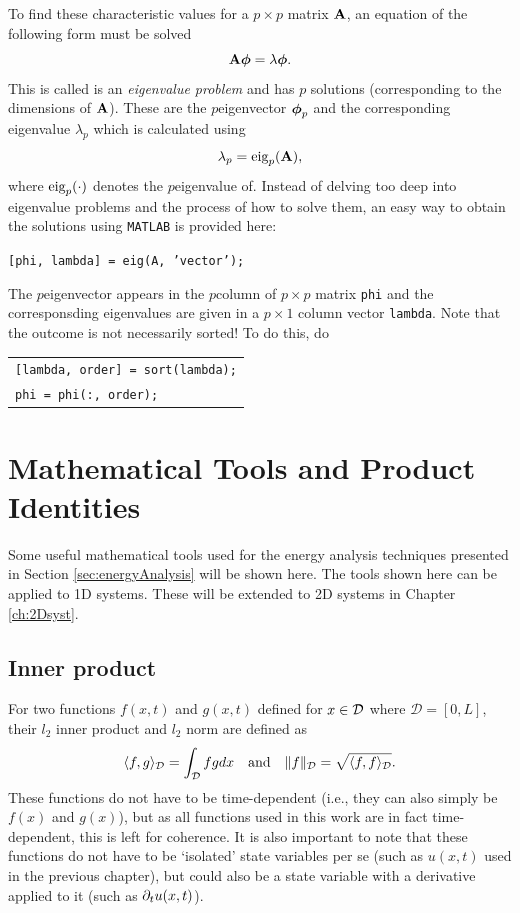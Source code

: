 To find these characteristic values for a $p\times p$ matrix $\mathbf{A}$, an equation of the following form must be solved 
\begin{equation}
    \mathbf{A} \boldsymbol{\phi} = \lambda \boldsymbol{\phi}.
\end{equation}
This is called is an \textit{eigenvalue problem} and has $p$ solutions (corresponding to the dimensions of $\mathbf{A}$). These are the $p$\th eigenvector $\boldsymbol{\phi}_p$ and the corresponding eigenvalue $\lambda_p$ which is calculated using
\begin{equation}
    \lambda_p = \text{eig}_p(\mathbf{A}),
\end{equation}
where $\text{eig}_p(\cdot)$ denotes the $p$\th eigenvalue of. Instead of delving too deep into eigenvalue problems and the process of how to solve them, an easy way to obtain the solutions using \texttt{MATLAB} is provided here:

\begin{center}
    \texttt{[phi, lambda] = eig(A, {\color[HTML]{A100F4}'vector'});}
\end{center}
The $p$\th eigenvector appears in the $p$\th column of $p\times p$ matrix \texttt{phi} and the corresponsding eigenvalues are given in a $p \times 1$ column vector \texttt{lambda}. Note that the outcome is not necessarily sorted! To do this, do 
%
\begin{center}
    \begin{tabular}{l}
    \texttt{[lambda, order] = sort(lambda);}\\
    \texttt{phi = phi(:, order);}
    \end{tabular}
\end{center}

\section{Mathematical Tools and Product Identities}
Some useful mathematical tools used for the energy analysis techniques presented in Section \ref{sec:energyAnalysis} will be shown here. The tools shown here can be applied to 1D systems. These will be extended to 2D systems in Chapter \ref{ch:2Dsyst}.

\subsection{Inner product}\label{sec:innerProduct}
For two functions $f(x,t)$ and $g(x,t)$ defined for $x\in\mathcal{D}$ where $\mathcal{D} = [0,L]$, their $l_2$ inner product and $l_2$ norm are defined as
\begin{equation}\label{eq:contInnerProd}
    \langle f, g\rangle_{\mathcal{D}} = \int_{\mathcal{D}} fg dx \quad \text{and} \quad \lVert f \rVert_{\mathcal{D}} = \sqrt{\langle f, f \rangle_{\mathcal{D}}}.
\end{equation}
These functions do not have to be time-dependent (i.e., they can also simply be $f(x)$ and $g(x)$), but as all functions used in this work are in fact time-dependent, this is left for coherence. It is also important to note that these functions do not have to be `isolated' state variables per se (such as $u(x,t)$ used in the previous chapter), but could also be a state variable with a derivative applied to it (such as $\partial_t u(x,t)$). 

